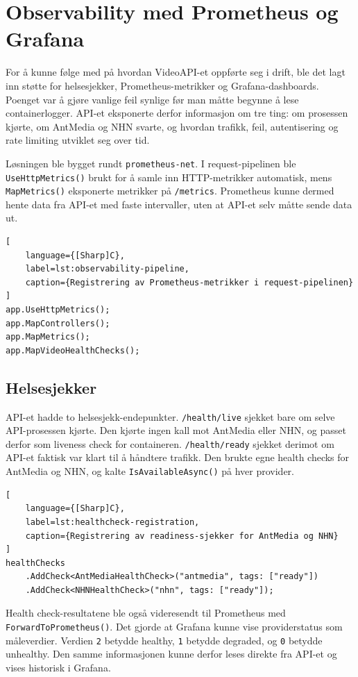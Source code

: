 \section{Observability med Prometheus og Grafana}

For å kunne følge med på hvordan VideoAPI-et oppførte seg i drift, ble det lagt inn støtte for helsesjekker, Prometheus-metrikker og Grafana-dashboards. Poenget var å gjøre vanlige feil synlige før man måtte begynne å lese containerlogger. API-et eksponerte derfor informasjon om tre ting: om prosessen kjørte, om AntMedia og NHN svarte, og hvordan trafikk, feil, autentisering og rate limiting utviklet seg over tid.

Løsningen ble bygget rundt \texttt{prometheus-net}. I request-pipelinen ble \texttt{UseHttpMetrics()} brukt for å samle inn HTTP-metrikker automatisk, mens \texttt{MapMetrics()} eksponerte metrikker på \texttt{/metrics}. Prometheus kunne dermed hente data fra API-et med faste intervaller, uten at API-et selv måtte sende data ut.

\begin{lstlisting}[
    language={[Sharp]C},
    label=lst:observability-pipeline,
    caption={Registrering av Prometheus-metrikker i request-pipelinen}
]
app.UseHttpMetrics();
app.MapControllers();
app.MapMetrics();
app.MapVideoHealthChecks();
\end{lstlisting}

\subsection{Helsesjekker}

API-et hadde to helsesjekk-endepunkter. \texttt{/health/live} sjekket bare om selve API-prosessen kjørte. Den kjørte ingen kall mot AntMedia eller NHN, og passet derfor som liveness check for containeren. \texttt{/health/ready} sjekket derimot om API-et faktisk var klart til å håndtere trafikk. Den brukte egne health checks for AntMedia og NHN, og kalte \texttt{IsAvailableAsync()} på hver provider.

\begin{lstlisting}[
    language={[Sharp]C},
    label=lst:healthcheck-registration,
    caption={Registrering av readiness-sjekker for AntMedia og NHN}
]
healthChecks
    .AddCheck<AntMediaHealthCheck>("antmedia", tags: ["ready"])
    .AddCheck<NHNHealthCheck>("nhn", tags: ["ready"]);
\end{lstlisting}

Health check-resultatene ble også videresendt til Prometheus med \texttt{ForwardToPrometheus()}. Det gjorde at Grafana kunne vise providerstatus som måleverdier. Verdien \texttt{2} betydde healthy, \texttt{1} betydde degraded, og \texttt{0} betydde unhealthy. Den samme informasjonen kunne derfor leses direkte fra API-et og vises historisk i Grafana.


